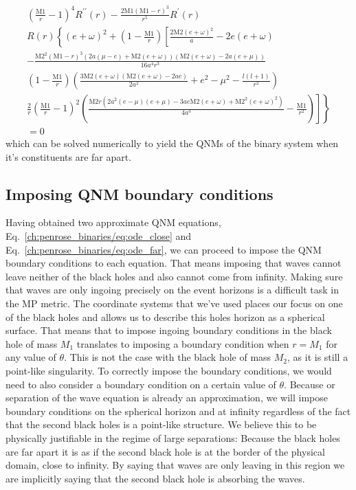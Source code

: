\begin{multline}
  \left(\frac{\text{M1}}{r}-1\right)^4 R^{\prime\prime}(r)-\frac{2 \text{M1} (\text{M1}-r)^3}{r^5} R^\prime(r)\\
  R(r) \left\{ (e+\omega )^2+\left(1-\frac{\text{M1}}{r}\right) \left[ \frac{2 \text{M2} (e+\omega )^2}{a}-2 e (e+\omega ) \right. \right. \\
  -\frac{\text{M2}^2 (\text{M1}-r)^3 (2 a (\mu -e)+\text{M2} (e+\omega )) (\text{M2} (e+\omega )-2 a (e+\mu ))}{16 a^4 r^3} \\
  \left(1-\frac{\text{M1}}{r}\right) \left(\frac{3 \text{M2} (e+\omega ) (\text{M2} (e+\omega )-2 a e)}{2 a^2}+e^2-\mu ^2-\frac{l (l+1)}{r^2}\right) \\
  \left. \left. \frac{2}{r} \left(\frac{\text{M1}}{r}-1\right)^2 \left(\frac{\text{M2} r \left(2 a^2 (e-\mu ) (e+\mu )-3 a e \text{M2} (e+\omega )+\text{M2}^2 (e+\omega )^2\right)}{4 a^3}-\frac{\text{M1}}{r^2}\right) \right] \right\} \\
  = 0
  \label{ch:penrose_binaries/eq:ode_far}
\end{multline}
%
which can be solved numerically to yield the QNMs of the binary system when it's constituents are far apart.

\subsection{Imposing QNM boundary conditions}

Having obtained two approximate QNM equations, Eq.~\eqref{ch:penrose_binaries/eq:ode_close} and Eq.~\eqref{ch:penrose_binaries/eq:ode_far}, we can proceed to impose the QNM boundary conditions to each equation. That means imposing that waves cannot leave neither of the black holes and also cannot come from infinity. Making sure that waves are only ingoing precisely on the event horizons is a difficult task in the MP metric. The coordinate systems that we've used places our focus on one of the black holes and allows us to describe this holes horizon as a spherical surface. That means that to impose ingoing boundary conditions in the black hole of mass $M_1$ translates to imposing a boundary condition when $r=M_1$ for any value of $\theta$. This is not the case with the black hole of mass $M_2$, as it is still a point-like singularity. To correctly impose the boundary conditions, we would need to also consider a boundary condition on a certain value of $\theta$. Because or separation of the wave equation is already an approximation, we will impose boundary conditions on the spherical horizon and at infinity regardless of the fact that the second black holes is a point-like structure. We believe this to be physically justifiable in the regime of large separations: Because the black holes are far apart it is as if the second black hole is at the border of the physical domain, close to infinity. By saying that waves are only leaving in this region we are implicitly saying that the second black hole is absorbing the waves.

